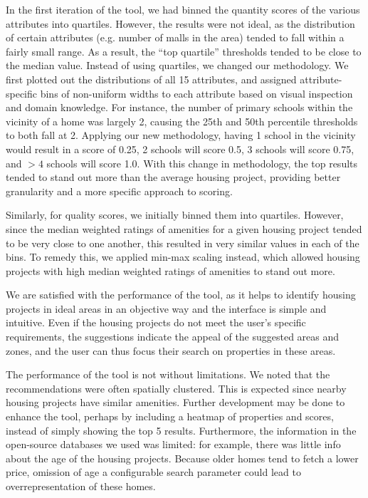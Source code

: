 \documentclass[a4paper, 11pt]{article}
\begin{document}
In the first iteration of the tool, we had binned the quantity scores of the various attributes into quartiles. However, the results were not ideal, as the distribution of certain attributes (e.g. number of malls in the area) tended to fall within a fairly small range. As a result, the “top quartile” thresholds tended to be close to the median value. Instead of using quartiles, we changed our methodology. We first plotted out the distributions of all 15 attributes, and assigned attribute-specific bins of non-uniform widths to each attribute based on visual inspection and domain knowledge. For instance, the number of primary schools within the vicinity of a home was largely 2, causing the 25th and 50th percentile thresholds to both fall at 2. Applying our new methodology, having 1 school in the vicinity would result in a score of 0.25, 2 schools will score 0.5, 3 schools will score 0.75, and $>4$ schools will score 1.0. With this change in methodology, the top results tended to stand out more than the average housing project, providing better granularity and a more specific approach to scoring.

Similarly, for quality scores, we initially binned them into quartiles. However, since the median weighted ratings of amenities for a given housing project tended to be very close to one another, this resulted in very similar values in each of the bins. To remedy this, we applied min-max scaling instead, which allowed housing projects with high median weighted ratings of amenities to stand out more.

We are satisfied with the performance of the tool, as it helps to identify housing projects in ideal areas in an objective way and the interface is simple and intuitive. Even if the housing projects do not meet the user’s specific requirements, the suggestions indicate the appeal of the suggested areas and zones, and the user can thus focus their search on properties in these areas.

The performance of the tool is not without limitations. We noted that the recommendations were often spatially clustered. This is expected since nearby housing projects have similar amenities. Further development may be done to enhance the tool, perhaps by including a heatmap of properties and scores, instead of simply showing the top 5 results. Furthermore, the information in the open-source databases we used was limited: for example, there was little info about the age of the housing projects. Because older homes tend to fetch a lower price, omission of age a configurable search parameter could lead to overrepresentation of these homes.
\end{document}
